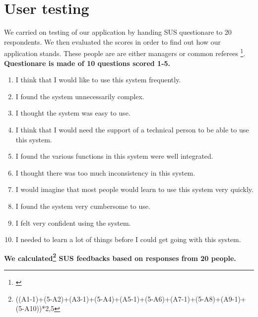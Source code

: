 \section{User testing}
We carried on testing of our application by handing SUS questionare to 20 respondents. We then evaluated the scores in order to find out how our application stands. These people are are either managers or common referees \footnote{\cite{SUSDesc}}. 
\newline
\textbf{Questionare is made of 10 questions scored 1-5.}
\begin{enumerate}
    \item I think that I would like to use this system frequently.
    \item I found the system unnecessarily complex.
    \item I thought the system was easy to use.
    \item I think that I would need the support of a technical person to be able to use this system.
    \item I found the various functions in this system were well integrated.
    \item I thought there was too much inconsistency in this system.
    \item I would imagine that most people would learn to use this system very quickly.
    \item I found the system very cumbersome to use.
    \item I felt very confident using the system.
    \item I needed to learn a lot of things before I could get going with this system.
\end{enumerate}
\textbf{We calculated\footnote{((A1-1)+(5-A2)+(A3-1)+(5-A4)+(A5-1)+(5-A6)+(A7-1)+(5-A8)+(A9-1)+(5-A10))*2,5} SUS feedbacks based on responses from 20 people.}
\newline
